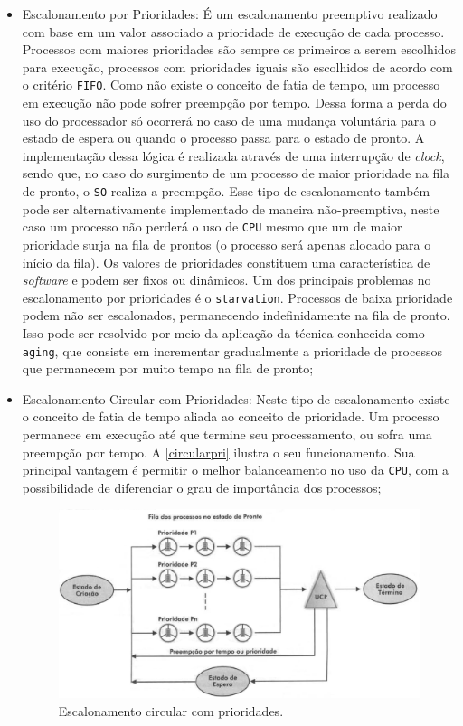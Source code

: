 \begin{itemize}
	\item Escalonamento por Prioridades:
É um escalonamento preemptivo realizado com base em um valor associado a prioridade de execução de cada processo. Processos com maiores prioridades são sempre os primeiros a serem escolhidos para execução, processos com prioridades iguais são escolhidos de acordo com o critério \texttt{FIFO}. Como não existe o conceito de fatia de tempo, um processo em execução não pode sofrer preempção por tempo. Dessa forma a perda do uso do processador só ocorrerá no caso de uma mudança voluntária para o estado de espera ou quando o processo passa para o estado de pronto. A implementação dessa lógica é realizada através de uma interrupção de \textit{clock}, sendo que, no caso do surgimento de um processo de maior prioridade na fila de pronto, o \texttt{SO} realiza a preempção. Esse tipo de escalonamento também pode ser alternativamente implementado de maneira não-preemptiva, neste caso um processo não perderá o uso de \texttt{CPU} mesmo que um de maior prioridade surja na fila de prontos (o processo será apenas alocado para o início da fila). Os valores de prioridades constituem uma característica de \textit{software} e podem ser fixos ou dinâmicos. Um dos principais problemas no escalonamento por prioridades é o \texttt{starvation}. Processos de baixa prioridade podem não ser escalonados, permanecendo indefinidamente na fila de pronto. Isso pode ser resolvido por meio da aplicação da técnica conhecida como \texttt{aging}, que consiste em incrementar gradualmente a prioridade de processos que permanecem por muito tempo na fila de pronto;
	\item Escalonamento Circular com Prioridades:
Neste tipo de escalonamento existe o conceito de fatia de tempo aliada ao conceito de prioridade. Um processo permanece em execução até que termine seu processamento, ou sofra uma preempção por tempo. A \autoref{circularpri} ilustra o seu funcionamento. Sua principal vantagem é permitir o melhor balanceamento no uso da \texttt{CPU}, com a possibilidade de diferenciar o grau de importância dos processos;

\begin{figure}[h]
	\centering
	\caption{\label{circularpri}Escalonamento circular com prioridades.}
		\includegraphics[keepaspectratio=true,scale=0.5]{figuras/circularpri.eps}
\end{figure}


\end{itemize}
